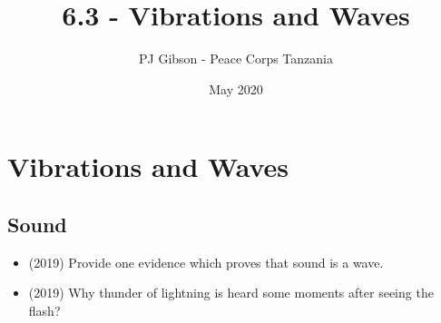 \documentclass{article}
\title{6.3 - Vibrations and Waves}
\author{PJ Gibson - Peace Corps Tanzania}
\date{May 2020}
\begin{document}
\maketitle


\section{Vibrations and Waves}

\subsection{Sound}
\begin{itemize}
\item (2019)  Provide one evidence which proves that sound is a wave.
\item (2019)  Why thunder of lightning is heard some moments after seeing the flash?
\end{itemize}
\end{document}
